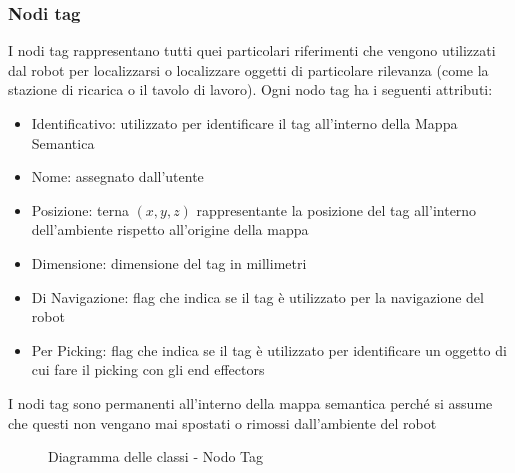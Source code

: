 \subsubsection{Nodi tag}
I nodi tag rappresentano tutti quei particolari riferimenti che vengono utilizzati dal robot per localizzarsi o localizzare oggetti di particolare rilevanza (come la stazione di ricarica o il tavolo di lavoro). Ogni nodo tag ha i seguenti attributi:
\begin{itemize}
  \item Identificativo: utilizzato per identificare il tag all'interno della Mappa Semantica
  \item Nome: assegnato dall'utente
  \item Posizione: terna $(x, y, z)$ rappresentante la posizione del tag all'interno dell'ambiente rispetto all'origine della mappa
  \item Dimensione: dimensione del tag in millimetri
  \item Di Navigazione: flag che indica se il tag è utilizzato per la navigazione del robot
  \item Per Picking: flag che indica se il tag è utilizzato per identificare un oggetto di cui fare il picking con gli end effectors
\end{itemize}
I nodi tag sono permanenti all'interno della mappa semantica perché si assume che questi non vengano mai spostati o rimossi dall'ambiente del robot

\begin{figure}[h]
  \centering
  \caption{Diagramma delle classi - Nodo Tag}
\end{figure}

